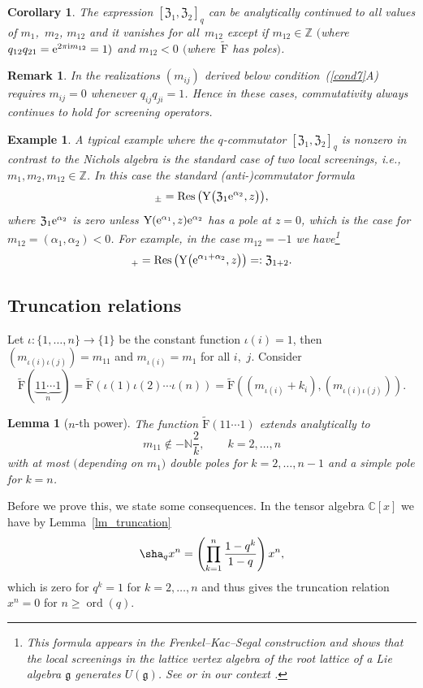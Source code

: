 \documentclass[10pt,a4paper]{amsart}
\numberwithin{equation}{section}
\newtheorem{cor}[teo]{Corollary}
\newtheorem{lem}[teo]{Lemma}
\newtheorem{ese}[teo]{Example}
\newtheorem{oss}[teo]{Remark} }
\newcommand{\N}{\mathbb{N}}
\newcommand{\Z}{\mathbb{Z}}
\newcommand{\C}{\mathbb{C}}
\renewcommand{\i}{\mathrm{i}}
\newcommand{\Y}{\mathrm{Y}}
\newcommand{\g}{\mathfrak{g}}
\newcommand{\zem}{\mathfrak{Z}}
\newcommand{\rFp}{\tilde{\mathrm{F}}}
\begin{document}
\begin{cor}The expression $[\zem_1,\zem_2]_q$ can be analytically continued to all values of $m_1$,~$m_2$, $m_{12}$ and it vanishes for all~$m_{12}$ except if $m_{12}\in \Z$ $($where $q_{12}q_{21}={\rm e}^{2\pi\i m_{12}}=1)$ and $m_{12}< 0$ $($where~$\rFp$ has poles$)$.
\end{cor}	
\begin{oss}
	In the realizations $(m_{ij})$ derived below condition~(\ref{cond7}A) requires $m_{ij}=0$ whenever $q_{ij}q_{ji}=1$. Hence in these cases, commutativity always continues to hold for screening operators.
\end{oss}
\begin{ese}\label{ex_notcommuative}
	A typical example where the $q$-commutator $[\zem_1,\zem_2]_q$ is nonzero in contrast to the Nichols algebra is the standard case of two local screenings, i.e., $m_1,m_2,m_{12}\in\Z$. In this case the standard (anti-)commutator formula
	\begin{gather*}
	[\zem_1,\zem_2]_\pm =\operatorname{Res}\big(\Y\big(\zem_1{\rm e}^{\alpha_2},z\big)\big),
	\end{gather*}
	where $\zem_1{\rm e}^{\alpha_2}$ is zero unless $\Y({\rm e}^{\alpha_1},z){\rm e}^{\alpha_2}$ has a pole at $z=0$, which is the case for $m_{12}=(\alpha_1,\alpha_2)\allowbreak <0$. For example, in the case $m_{12}=-1$ we have\footnote{This formula appears in the Frenkel--Kac--Segal construction and shows that the local screenings in the lattice vertex algebra of the root lattice of a Lie algebra $\g$ generates $U(\g)$. See \cite[Section~5.6]{Kac98} or in our context \cite[Section~3.6]{Len17}.}
	\begin{gather*}
	[\zem_1,\zem_2]_+ =\operatorname{Res}\big(\Y\big({\rm e}^{\alpha_1+\alpha_2},z\big)\big)=:\zem_{1+2}.
	\end{gather*}
\end{ese}	
	
\subsection{Truncation relations}\label{sec_truncation}
Let $\iota\colon \{1,\dots,n\}\to \{1\}$ be the constant function $\iota(i)=1$, then $(m_{\iota(i)\iota(j)})=m_{11}$ and $m_{\iota(i)}=m_1$ for all $i$,~$j$. Consider
\[\rFp(\underbrace{11\cdots 1}_n)=\rFp(\iota(1)\iota(2)\cdots \iota(n))=\rFp((m_{\iota(i)}+k_i),(m_{\iota(i)\iota(j)})).\]
\begin{lem}[$n$-th power]\label{lm_rFpTrunc}
	The function $\rFp(11\cdots 1)$ extends analytically to
	\[m_{11}\not\in -\N\frac{2}{k},\qquad k=2,\dots, n\]
	with at most $($depending on $m_1)$ double poles for $k=2,\dots, n-1$ and a simple pole for $k=n$.
\end{lem}
Before we prove this, we state some consequences. In the tensor algebra $\C[x]$ we have by Lemma~\ref{lm_truncation}
\[
\sha_q x^n=\left(\prod_{k=1}^n\frac{1-q^k}{1-q} \right)x^n,
\]
which is zero for $q^k=1$ for $k=2,\dots, n$ and thus gives the truncation relation $x^n=0$ for $n\geq \operatorname{ord}(q)$.
\end{document}
